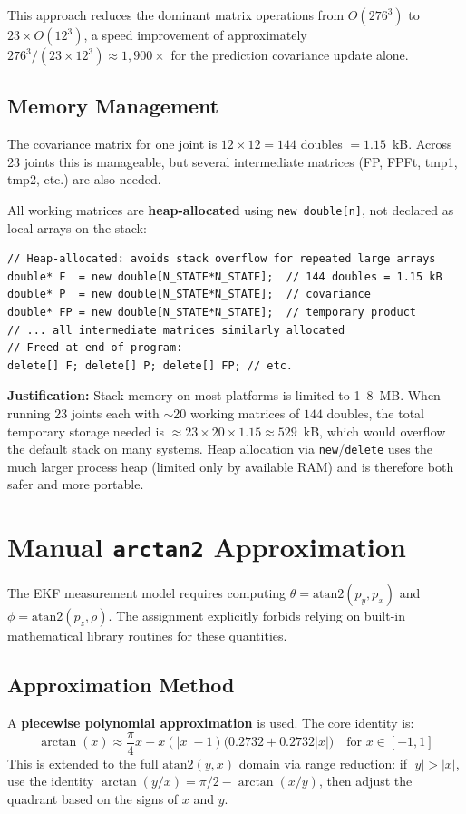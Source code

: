 \documentclass[12pt,a4paper]{article}
\begin{document}
This approach reduces the dominant matrix operations from $O(276^3)$ to
$23 \times O(12^3)$, a speed improvement of approximately $276^3 / (23 \times 12^3)
\approx 1{,}900\times$ for the prediction covariance update alone.

\subsection{Memory Management}
\label{sec:memory}
The covariance matrix for one joint is $12\times12 = 144$ doubles $= 1.15$~kB.
Across 23 joints this is manageable, but several intermediate matrices (FP, FPFt,
tmp1, tmp2, etc.) are also needed.

All working matrices are \textbf{heap-allocated} using \texttt{new double[n]},
not declared as local arrays on the stack:

\begin{lstlisting}[caption={Heap allocation of large working matrices}]
// Heap-allocated: avoids stack overflow for repeated large arrays
double* F  = new double[N_STATE*N_STATE];  // 144 doubles = 1.15 kB
double* P  = new double[N_STATE*N_STATE];  // covariance
double* FP = new double[N_STATE*N_STATE];  // temporary product
// ... all intermediate matrices similarly allocated
// Freed at end of program:
delete[] F; delete[] P; delete[] FP; // etc.
\end{lstlisting}

\textbf{Justification:} Stack memory on most platforms is limited to 1--8~MB.
When running 23 joints each with $\sim$20 working matrices of $144$ doubles,
the total temporary storage needed is $\approx 23 \times 20 \times 1.15 \approx 529$~kB,
which would overflow the default stack on many systems. Heap allocation via
\texttt{new}/\texttt{delete} uses the much larger process heap (limited only by
available RAM) and is therefore both safer and more portable.

\section{Manual \texttt{arctan2} Approximation}
\label{sec:atan2}

The EKF measurement model requires computing $\theta = \text{atan2}(p_y, p_x)$
and $\phi = \text{atan2}(p_z, \rho)$. The assignment explicitly forbids relying
on built-in mathematical library routines for these quantities.

\subsection{Approximation Method}
A \textbf{piecewise polynomial approximation} is used. The core identity is:
\[
    \arctan(x) \approx \frac{\pi}{4}x - x(|x|-1)\bigl(0.2732 + 0.2732|x|\bigr)
    \quad \text{for } x \in [-1, 1]
\]
This is extended to the full $\text{atan2}(y, x)$ domain via range reduction:
if $|y| > |x|$, use the identity $\arctan(y/x) = \pi/2 - \arctan(x/y)$,
then adjust the quadrant based on the signs of $x$ and $y$.
\end{document}
